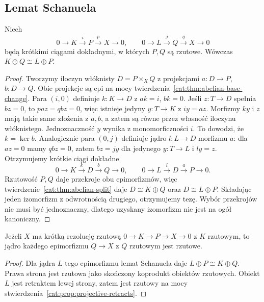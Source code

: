 \subsection{Lemat Schanuela}
\begin{twierdzenie}\label{cat:thm:schanuel}
Niech
\[
 0\to K\xrightarrow{i}P\xrightarrow{p}X\to0,\qquad
 0\to L\xrightarrow{j}Q\xrightarrow{q}X\to0
\]
będą krótkimi ciągami dokładnymi, w których $P,Q$ są rzutowe. Wówczas $K\oplus Q\cong L\oplus P$.
\end{twierdzenie}
\begin{proof}
Tworzymy iloczyn włóknisty $D=P\times_X Q$ z projekcjami $a:D\to P$, $b:D\to Q$. Obie projekcje są epi na mocy twierdzenia~\ref{cat:thm:abelian-base-change}. Para $(i,0)$ definiuje $k:K\to D$ z $ak=i$, $bk=0$. Jeśli $z:T\to D$ spełnia $bz=0$, to $paz=qbz=0$, więc istnieje jedyny $y:T\to K$ z $iy=az$. Morfizmy $ky$ i $z$ mają takie same złożenia z $a,b$, a zatem są równe przez własność iloczynu włóknistego. Jednoznaczność $y$ wynika z monomorficzności $i$. To dowodzi, że $k=\ker b$. Analogicznie para $(0,j)$ definiuje jądro $l:L\to D$ morfizmu $a$: dla $az=0$ mamy $qbz=0$, zatem $bz=jy$ dla jedynego $y:T\to L$ i $ly=z$.
Otrzymujemy krótkie ciągi dokładne
\[
 0\to K\xrightarrow{k}D\xrightarrow{b}Q\to0,\qquad
 0\to L\xrightarrow{l}D\xrightarrow{a}P\to0.
\]
Rzutowość $P,Q$ daje przekroje obu epimorfizmów, więc twierdzenie~\ref{cat:thm:abelian-split} daje $D\cong K\oplus Q$ oraz $D\cong L\oplus P$. Składając jeden izomorfizm z odwrotnością drugiego, otrzymujemy tezę. Wybór przekrojów nie musi być jednoznaczny, dlatego uzyskany izomorfizm nie jest na ogół kanoniczny.
\end{proof}
\begin{wniosek}\label{cat:cor:schanuel-projectivity}
Jeżeli $X$ ma krótką rezolucję rzutową $0\to K\to P\to X\to0$ z $K$ rzutowym, to jądro każdego epimorfizmu $Q\to X$ z $Q$ rzutowym jest rzutowe.
\end{wniosek}
\begin{proof}
Dla jądra $L$ tego epimorfizmu lemat Schanuela daje $L\oplus P\cong K\oplus Q$. Prawa strona jest rzutowa jako skończony koprodukt obiektów rzutowych. Obiekt $L$ jest retraktem lewej strony, zatem jest rzutowy na mocy stwierdzenia~\ref{cat:prop:projective-retracts}.
\end{proof}

